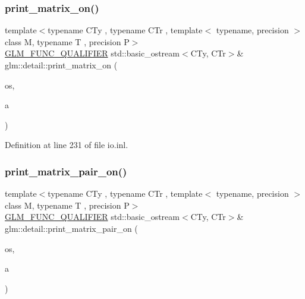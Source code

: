 \mbox{\label{namespaceglm_1_1detail_a705becbf05df4c8637731f85569fc0e6}} 
\subsubsection{\texorpdfstring{print\_matrix\_on()}{print\_matrix\_on()}}
{\footnotesize\ttfamily template$<$typename C\+Ty , typename C\+Tr , template$<$ typename, precision $>$ class M, typename T , precision P$>$ \\
\mbox{\hyperlink{setup_8hpp_a33fdea6f91c5f834105f7415e2a64407}{G\+L\+M\+\_\+\+F\+U\+N\+C\+\_\+\+Q\+U\+A\+L\+I\+F\+I\+ER}} std\+::basic\+\_\+ostream$<$C\+Ty, C\+Tr$>$\& glm\+::detail\+::print\+\_\+matrix\+\_\+on (\begin{DoxyParamCaption}\item[{std\+::basic\+\_\+ostream$<$ C\+Ty, C\+Tr $>$ \&}]{os,  }\item[{M$<$ T, P $>$ const \&}]{a }\end{DoxyParamCaption})}



Definition at line 231 of file io.\+inl.

\mbox{\label{namespaceglm_1_1detail_aff6c8f1c43115431bf40167f6638b78f}} 
\subsubsection{\texorpdfstring{print\_matrix\_pair\_on()}{print\_matrix\_pair\_on()}}
{\footnotesize\ttfamily template$<$typename C\+Ty , typename C\+Tr , template$<$ typename, precision $>$ class M, typename T , precision P$>$ \\
\mbox{\hyperlink{setup_8hpp_a33fdea6f91c5f834105f7415e2a64407}{G\+L\+M\+\_\+\+F\+U\+N\+C\+\_\+\+Q\+U\+A\+L\+I\+F\+I\+ER}} std\+::basic\+\_\+ostream$<$C\+Ty, C\+Tr$>$\& glm\+::detail\+::print\+\_\+matrix\+\_\+pair\+\_\+on (\begin{DoxyParamCaption}\item[{std\+::basic\+\_\+ostream$<$ C\+Ty, C\+Tr $>$ \&}]{os,  }\item[{std\+::pair$<$ M$<$ T, P $>$ const, M$<$ T, P $>$ const $>$ const \&}]{a }\end{DoxyParamCaption})}



